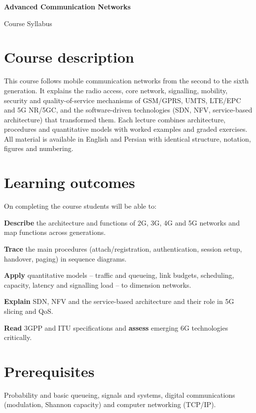 \documentclass[11pt,a4paper]{article}
\begin{document}
\begin{center}
  {\sffamily\bfseries\color{acnnavy}\LARGE Advanced Communication Networks\par}
  \vspace{2pt}
  {\sffamily\color{acnteal}\Large Course Syllabus\par}
  \vspace{2pt}
  {\par}
\end{center}

\section{Course description}
This course follows mobile communication networks from the second to the sixth generation. It explains the radio access, core network, signalling,
mobility, security and quality-of-service mechanisms of GSM/GPRS, UMTS, LTE/EPC and 5G NR/5GC, and the software-driven technologies (SDN, NFV,
service-based architecture) that transformed them. Each lecture combines architecture, procedures and quantitative models with worked examples and
graded exercises. All material is available in English and Persian with identical structure, notation, figures and numbering.

\section{Learning outcomes}
On completing the course students will be able to:
\begin{objectives}
  \item \textbf{Describe} the architecture and functions of 2G, 3G, 4G and 5G networks and map functions across generations.
  \item \textbf{Trace} the main procedures (attach/registration, authentication, session setup, handover, paging) in sequence diagrams.
  \item \textbf{Apply} quantitative models -- traffic and queueing, link budgets, scheduling, capacity, latency and signalling load -- to dimension networks.
  \item \textbf{Explain} SDN, NFV and the service-based architecture and their role in 5G slicing and QoS.
  \item \textbf{Read} 3GPP and ITU specifications and \textbf{assess} emerging 6G technologies critically.
\end{objectives}

\section{Prerequisites}
Probability and basic queueing, signals and systems, digital communications (modulation, Shannon capacity) and computer networking (TCP/IP).
\end{document}
